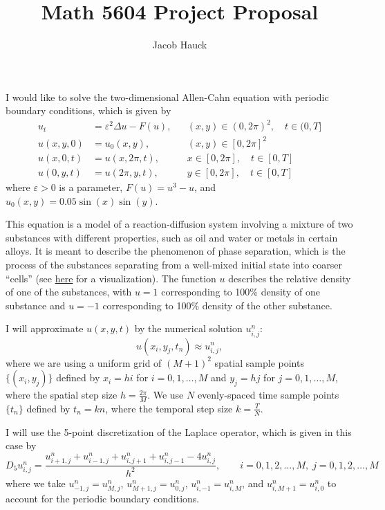 \documentclass{article}
\title{Math 5604 Project Proposal}
\author{Jacob Hauck}
\begin{document}
	\maketitle
	
	I would like to solve the two-dimensional Allen-Cahn equation \cite{yang_2018} with periodic boundary conditions, which is given by
	\begin{align}
		u_t &= \varepsilon^2 \Delta u - F(u),& & (x,y) \in (0,2\pi)^2,\quad t \in (0,T] \\
		u(x,y, 0) &= u_0(x,y),& & (x,y) \in [0,2\pi]^2 \\
		u(x, 0,t) &= u(x, 2\pi, t), & & x \in [0,2\pi],\quad t \in [0,T] \\
		u(0,y,t) &= u(2\pi,y,t), & & y \in [0,2\pi],\quad t \in [0,T]
	\end{align}
	where $\varepsilon > 0$ is a parameter, $F(u) = u^3 - u$, and $u_0(x,y) = 0.05\sin(x)\sin(y)$. 
	
	This equation is a model of a reaction-diffusion system involving a mixture of two substances with different properties, such as oil and water or metals in certain alloys. It is meant to describe the phenomenon of phase separation, which is the process of the substances separating from a well-mixed initial state into coarser ``cells'' (see \href{https://www.youtube.com/watch?v=t1swj0QJUTw}{here} for a visualization). The function $u$ describes the relative density of one of the substances, with $u = 1$ corresponding to 100\% density of one substance and $u=-1$ corresponding to 100\% density of the other substance.
	
	I will approximate $u(x,y,t)$ by the numerical solution $u^n_{i,j}$:
	\begin{equation}
		u(x_i,y_j, t_n) \approx u^n_{i,j},
	\end{equation}
	where we are using a uniform grid of $(M+1)^2$ spatial sample points $\{(x_i,y_j)\}$ defined by $x_i = hi$ for $i = 0,1,\dots, M$ and $y_j = hj$ for $j =0,1,\dots,M$, where the spatial step size $h = \frac{2\pi}{M}$. We use $N$ evenly-spaced time sample points $\{t_n\}$ defined by $t_n = kn$, where the temporal step size $k = \frac{T}{N}$.
	
	I will use the 5-point discretization of the Laplace operator, which is given in this case by
	\begin{equation}
		D_5u^n_{i,j} = \frac{u^n_{i+1,j} + u^n_{i-1,j} + u^n_{i,j+1} + u^n_{i,j-1} - 4u^n_{i,j}}{h^2},\qquad i=0,1,2,\dots,M,\;j=0,1,2,\dots, M
	\end{equation}
	where we take $u^n_{-1,j} = u^n_{M,j}$, $u^n_{M+1,j} = u^n_{0,j}$, $u^n_{i,-1} = u^n_{i,M}$, and $u^n_{i,M+1} = u^n_{i,0}$ to account for the periodic boundary conditions.
	
\end{document}
